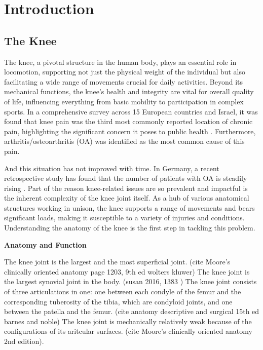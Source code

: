 \documentclass{micro-econ-thesis}
\begin{document}

\cleardoublepage
\pagestyle{headings}
\setcounter{page}{1}
\onehalfspacing %


\section{Introduction}
\label{sec:intro}


\subsection{The Knee }
The knee, a pivotal structure in the human body, plays an essential role in locomotion, supporting not just the physical weight of the individual but also facilitating a wide range of movements crucial for daily activities. Beyond its mechanical functions, the knee's health and integrity are vital for overall quality of life, influencing everything from basic mobility to participation in complex sports. In a comprehensive survey across 15 European countries and Israel, it was found that knee pain was the third most commonly reported location of chronic pain, highlighting the significant concern it poses to public health \parencite{breivik_survey_2006}. Furthermore, arthritis/osteoarthritis (OA) was identified as the most common cause of this pain. 

And this situation has not improved with time. In Germany, a recent retrospective study has found that the number of patients with OA is steadily rising \parencite{obermuller_epidemiology_2024}. 
Part of the reason knee-related issues are so prevalent and impactful is the inherent complexity of the knee joint itself. As a hub of various anatomical structures working in unison, the knee supports a range of movements and bears significant loads, making it susceptible to a variety of injuries and conditions.
Understanding the anatomy of the knee is the first step in tackling this problem. 

\textbf{Anatomy and Function}

The knee joint is the largest and the most superficial joint. (cite Moore's clinically oriented anatomy page 1203, 9th ed wolters kluwer) 
The knee joint is the largest synovial joint in the body. (susan 2016, 1383 ) 
The knee joint consists of three articulations in one: one between each condyle of the femur and the corresponding tuberosity of the tibia, which are condyloid joints, and one between the patella and the femur. (cite anatomy descriptive and surgical 15th ed barnes and noble) 
The knee joint is mechanically relatively weak because of the configurations of its aritcular surfaces. (cite Moore's clinically oriented anatomy 2nd edition). 
\end{document}
